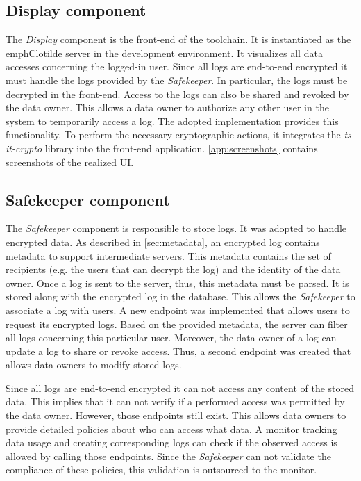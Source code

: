 \documentclass[../main.tex]{subfiles}
\begin{document}
\subsection{Display component}
The \emph{Display} component is the front-end of the toolchain.
It is instantiated as the emph{Clotilde} server in the development environment.
It visualizes all data accesses concerning the logged-in user.
Since all logs are end-to-end encrypted it must handle the logs provided by the \emph{Safekeeper}.
In particular, the logs must be decrypted in the front-end.
Access to the logs can also be shared and revoked by the data owner.
This allows a data owner to authorize any other user in the system to temporarily access a log.
The adopted implementation provides this functionality.
To perform the necessary cryptographic actions, it integrates the \emph{ts-it-crypto} library into the front-end application.
\cref{app:screenshots} contains screenshots of the realized UI.

\subsection{Safekeeper component}
The \emph{Safekeeper} component is responsible to store logs.
It was adopted to handle encrypted data.
As described in \cref{sec:metadata}, an encrypted log contains metadata to support intermediate servers.
This metadata contains the set of recipients (e.g. the users that can decrypt the log) and the identity of the data owner.
Once a log is sent to the server, thus, this metadata must be parsed.
It is stored along with the encrypted log in the database.
This allows the \emph{Safekeeper} to associate a log with users.
A new endpoint was implemented that allows users to request its encrypted logs.
Based on the provided metadata, the server can filter all logs concerning this particular user.
Moreover, the data owner of a log can update a log to share or revoke access.
Thus, a second endpoint was created that allows data owners to modify stored logs.

Since all logs are end-to-end encrypted it can not access any content of the stored data.
This implies that it can not verify if a performed access was permitted by the data owner.
However, those endpoints still exist.
This allows data owners to provide detailed policies about who can access what data.
A monitor tracking data usage and creating corresponding logs can check if the observed access is allowed by calling those endpoints.
Since the \emph{Safekeeper} can not validate the compliance of these policies, this validation is outsourced to the monitor.
\end{document}
